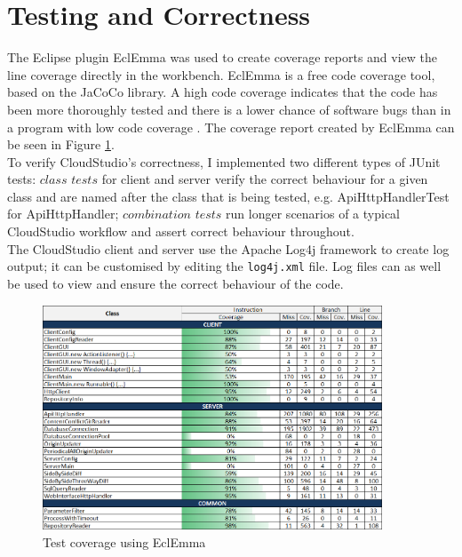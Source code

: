 \section{Testing and Correctness}

The Eclipse plugin EclEmma \cite{eclemma} was used to create coverage reports and view the line coverage directly in the workbench. EclEmma is a free code coverage tool, based on the JaCoCo library. A high code coverage indicates that the code has been more thoroughly tested and there is a lower chance of software bugs than in a program with low code coverage \cite{codecoverage}. The coverage report created by EclEmma can be seen in Figure \ref{fig:testcoverage}. \\

To verify CloudStudio's correctness, I implemented two different types of JUnit \cite{junit} tests: $class$ $tests$ for client and server verify the correct behaviour for a given class and are named after the class that is being tested, e.g. ApiHttpHandlerTest for ApiHttpHandler; $combination$ $tests$ run longer scenarios of a typical CloudStudio workflow and assert correct behaviour throughout. \\

The CloudStudio client and server use the Apache Log4j \cite{log4j} framework to create log output; it can be customised by editing the \texttt{log4j.xml} file. Log files can as well be used to view and ensure the correct behaviour of the code.


\begin{figure}[h!]
  \centering
      \includegraphics[width=0.9\textwidth]{coverage}
  \caption{Test coverage using EclEmma}
  \label{fig:testcoverage}
\end{figure}



